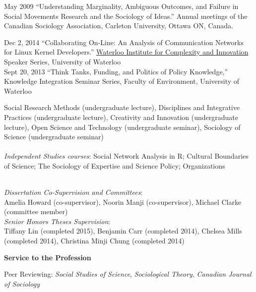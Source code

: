 \documentclass[9pt,usenames,dvipsnames]{article}
\begin{document}
\ind May 2009 ``Understanding Marginality, Ambiguous Outcomes, and Failure in Social Movements Research and the Sociology of Ideas.'' Annual meetings of the Canadian Sociology Association, Carleton University, Ottawa ON, Canada.\\


\ind Dec 2, 2014 ``Collaborating On-Line: An Analysis of Communication Networks for Linux Kernel Developers.'' \href{http://wici.ca/}{Waterloo Institute for Complexity and Innovation} Speaker Series, University of Waterloo \\


\ind Sept 20, 2013 ``Think Tanks, Funding, and Politics of Policy Knowledge,'' Knowledge Integration Seminar Series, Faculty of Environment, University of Waterloo \\



\noindent Social Research Methods (undergraduate lecture), Disciplines and Integrative Practices (undergraduate lecture), Creativity and Innovation (undergraduate lecture), Open Science and Technology (undergraduate seminar), Sociology of Science (undergraduate seminar) \\
\\
\noindent \emph{Independent Studies courses}: Social Network Analysis in R; Cultural Boundaries of Science; The Sociology of Expertise and Science Policy; Organizations \\ %
\\


\noindent \emph{Dissertation Co-Supervision and Committees}:  \\
\noindent Amelia Howard (co-supervisor), Noorin Manji (co-supervisor), Michael Clarke (committee member) \\

\noindent \emph{Senior Honors Theses Supervision}: \\
\noindent Tiffany Lin (completed 2015), Benjamin Carr (completed 2014), Chelsea Mills (completed 2014), Christina Minji Chung (completed 2014) \\


\ind \textbf{Service to the Profession}

\noindent Peer Reviewing: {\it Social Studies of Science}, {\it Sociological Theory}, {\it Canadian Journal of Sociology}\\
\end{document}
